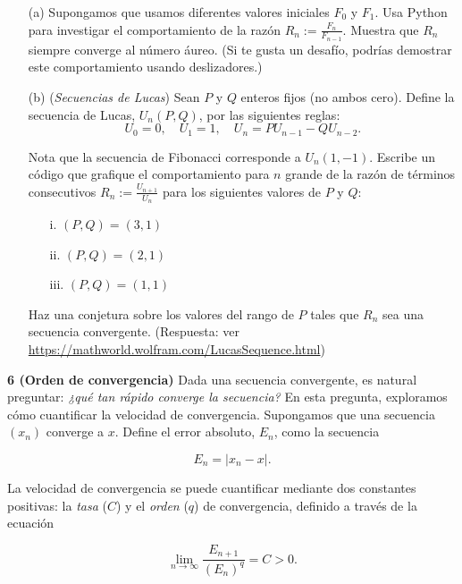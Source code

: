 \documentclass{article}
\begin{document}
\begin{itemize}
    \item[(a)] Supongamos que usamos diferentes valores iniciales \(F_0\) y \(F_1\). Usa Python para investigar el comportamiento de la razón \(R_n := \frac{F_n}{F_{n-1}}\). Muestra que \(R_n\) siempre converge al número áureo.  
    (Si te gusta un desafío, podrías demostrar este comportamiento usando deslizadores.)
    
    \item[(b)] (\textit{Secuencias de Lucas}) Sean \(P\) y \(Q\) enteros fijos (no ambos cero). Define la secuencia de Lucas, \(U_n(P, Q)\), por las siguientes reglas:
    \[
    U_0 = 0, \quad U_1 = 1, \quad U_n = PU_{n-1} - QU_{n-2}.
    \]
    
    Nota que la secuencia de Fibonacci corresponde a \(U_n(1, -1)\).  
    Escribe un código que grafique el comportamiento para \(n\) grande de la razón de términos consecutivos \(R_n := \frac{U_{n+1}}{U_n}\) para los siguientes valores de \(P\) y \(Q\):
    \begin{itemize}
        \item[i.] \((P, Q) = (3, 1)\)
        \item[ii.] \((P, Q) = (2, 1)\)
        \item[iii.] \((P, Q) = (1, 1)\)
    \end{itemize}
    
    Haz una conjetura sobre los valores del rango de \(P\) tales que \(R_n\) sea una secuencia convergente.  
    (Respuesta: ver \url{https://mathworld.wolfram.com/LucasSequence.html})
\end{itemize}


\textbf{6 (Orden de convergencia)} Dada una secuencia convergente, es natural preguntar: \textit{¿qué tan rápido converge la secuencia?} En esta pregunta, exploramos cómo cuantificar la velocidad de convergencia.  
Supongamos que una secuencia \((x_n)\) converge a \(x\). Define el error absoluto, \(E_n\), como la secuencia

\[
E_n = |x_n - x|.
\]

La velocidad de convergencia se puede cuantificar mediante dos constantes positivas: la \textit{tasa} (\(C\)) y el \textit{orden} (\(q\)) de convergencia, definido a través de la ecuación

\[
\lim_{n \to \infty} \frac{E_{n+1}}{(E_n)^q} = C > 0.
\]
\end{document}
